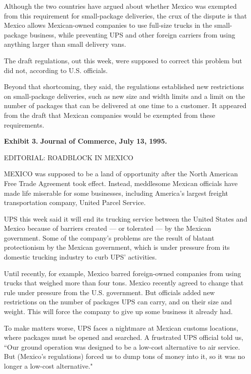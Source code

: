 \documentclass[letterpaper,12pt]{article}
\begin{document}
Although the two countries have argued about whether Mexico was
exempted from this requirement for small-package deliveries, the
crux of the dispute is that Mexico allows Mexican-owned companies to
use full-size trucks in the small-package business, while preventing
UPS and other foreign carriers from using anything larger than small
delivery vans.

The draft regulations, out this week, were supposed to correct this
problem but did not, according to U.S. officials.

Beyond that shortcoming, they said, the regulations established new
restrictions on small-package deliveries, such as new size and width
limits and a limit on the number of packages that can be delivered
at one time to a customer. It appeared from the draft that Mexican
companies would be exempted from these requirements.


\newpage
{\bf Exhibit 3.} {\bf Journal of Commerce, July 13, 1995.}

EDITORIAL:  ROADBLOCK IN MEXICO

MEXICO was supposed to be a land of opportunity after the North
American Free Trade Agreement took effect. Instead, meddlesome
Mexican officials have made life miserable for some businesses,
including America's largest freight transportation company, United
Parcel Service.

UPS this week said it will end its trucking service between the
United States and Mexico because of barriers created --- or
tolerated --- by the Mexican government. Some of the company's
problems are the result of blatant protectionism by the Mexican
government, which is under pressure from its domestic trucking
industry to curb UPS' activities.

Until recently, for example, Mexico barred foreign-owned companies
from using trucks that weighed more than four tons. Mexico recently
agreed to change that rule under pressure from the U.S. government.
But officials added new restrictions on the number of packages UPS
can carry, and on their size and weight. This will force the company
to give up some business it already had.

To make matters worse, UPS faces a nightmare at Mexican customs
locations, where packages must be opened and searched. A frustrated
UPS official told us, ``Our ground operation was designed to be a
low-cost alternative to air service. But (Mexico's regulations)
forced us to dump tons of money into it, so it was no longer a
low-cost alternative."
\end{document}
